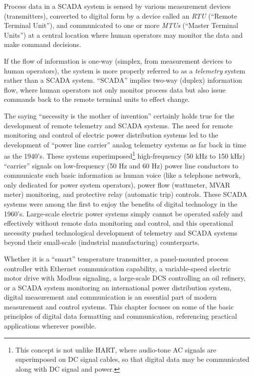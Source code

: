 Process data in a SCADA system is sensed by various measurement devices (transmitters), converted to digital form by a device called an \textit{RTU} (``Remote Terminal Unit''), and communicated to one or more \textit{MTUs} (``Master Terminal Units'') at a central location where human operators may monitor the data and make command decisions.            

If the flow of information is one-way (simplex, from measurement devices to human operators), the system is more properly referred to as a \textit{telemetry} system rather than a SCADA system.  ``SCADA'' implies two-way (duplex) information flow, where human operators not only monitor process data but also issue commands back to the remote terminal units to effect change.    

The saying ``necessity is the mother of invention'' certainly holds true for the development of remote telemetry and SCADA systems.  The need for remote monitoring and control of electric power distribution systems led to the development of ``power line carrier'' analog telemetry systems as far back in time as the 1940's.  These systems superimposed\footnote{This concept is not unlike HART, where audio-tone AC signals are superimposed on DC signal cables, so that digital data may be communicated along with DC signal and power.} high-frequency (50 kHz to 150 kHz) ``carrier'' signals on low-frequency (50 Hz and 60 Hz) power line conductors to communicate such basic information as human voice (like a telephone network, only dedicated for power system operators), power flow (wattmeter, MVAR meter) monitoring, and protective relay (automatic trip) controls.  These SCADA systems were among the first to enjoy the benefits of digital technology in the 1960's.  Large-scale electric power systems simply cannot be operated safely and effectively without remote data monitoring and control, and this operational necessity pushed technological development of telemetry and SCADA systems beyond their small-scale (industrial manufacturing) counterparts.  

\vskip 10pt

Whether it is a ``smart'' temperature transmitter, a panel-mounted process controller with Ethernet communication capability, a variable-speed electric motor drive with Modbus signaling, a large-scale DCS controlling an oil refinery, or a SCADA system monitoring an international power distribution system, digital measurement and communication is an essential part of modern measurement and control systems.  This chapter focuses on some of the basic principles of digital data formatting and communication, referencing practical applications wherever possible.













